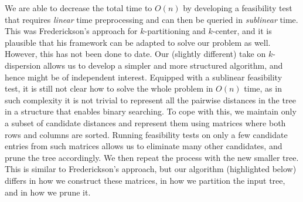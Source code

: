 \documentclass[a4paper,UKenglish]{lipics-v2016}
\theoremstyle{plain}
\begin{document}
 
\vspace{0.04in} 
We are able to decrease the total time to $O(n)$ by
developing a feasibility test that requires {\em linear} time preprocessing and can then be queried in \emph{sublinear} time. This was Frederickson's approach for $k$-partitioning and $k$-center, and it is plausible that his framework can be adapted to solve our problem as well.
However, this has not been done to date. Our (slightly different) take on $k$-dispersion allows us to develop a  simpler and more structured algorithm, and hence might be of independent interest.
Equipped with a sublinear feasibility test, it is still not clear how to solve the whole problem in $O(n)$ time, as in such complexity it is not trivial to represent all the pairwise distances in the tree in a structure that enables binary searching. To cope with this, we maintain only a subset of candidate distances and represent them using matrices where both rows and columns are sorted. Running feasibility tests on only a few candidate entries from such matrices allows us to eliminate many other candidates, and prune the tree accordingly. We then repeat the process with the new smaller tree.
This is similar to Frederickson's approach, but our algorithm (highlighted below) differs in how we construct these matrices,  in how we partition the input tree, and in how we prune it. 
\end{document}
